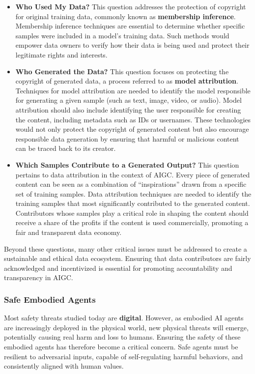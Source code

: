 \begin{itemize} 
\item \textbf{Who Used My Data?} This question addresses the protection of copyright for original training data, commonly known as \textbf{membership inference}. Membership inference techniques are essential to determine whether specific samples were included in a model's training data. Such methods would empower data owners to verify how their data is being used and protect their legitimate rights and interests.

\item \textbf{Who Generated the Data?} This question focuses on protecting the copyright of generated data, a process referred to as \textbf{model attribution}. Techniques for model attribution are needed to identify the model responsible for generating a given sample (such as text, image, video, or audio). Model attribution should also include identifying the user responsible for creating the content, including metadata such as IDs or usernames. These technologies would not only protect the copyright of generated content but also encourage responsible data generation by ensuring that harmful or malicious content can be traced back to its creator.

\item \textbf{Which Samples Contribute to a Generated Output?} This question pertains to data attribution in the context of AIGC. Every piece of generated content can be seen as a combination of ``inspirations'' drawn from a specific set of training samples. Data attribution techniques are needed to identify the training samples that most significantly contributed to the generated content. Contributors whose samples play a critical role in shaping the content should receive a share of the profits if the content is used commercially, promoting a fair and transparent data economy.

\end{itemize}

Beyond these questions, many other critical issues must be addressed to create a sustainable and ethical data ecosystem. Ensuring that data contributors are fairly acknowledged and incentivized is essential for promoting accountability and transparency in AIGC.

\subsubsection{Safe Embodied Agents}

Most safety threats studied today are \textbf{digital}. However, as embodied AI agents are increasingly deployed in the physical world, new physical threats will emerge, potentially causing real harm and loss to humans. Ensuring the safety of these embodied agents has therefore become a critical concern. Safe agents must be resilient to adversarial inputs, capable of self-regulating harmful behaviors, and consistently aligned with human values.

